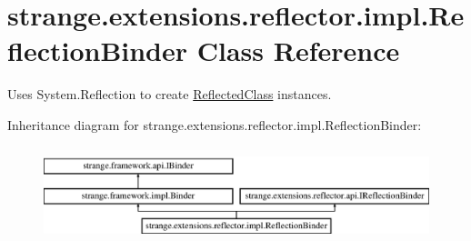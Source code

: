 \hypertarget{classstrange_1_1extensions_1_1reflector_1_1impl_1_1_reflection_binder}{\section{strange.\-extensions.\-reflector.\-impl.\-Reflection\-Binder Class Reference}
\label{classstrange_1_1extensions_1_1reflector_1_1impl_1_1_reflection_binder}
}


Uses System.\-Reflection to create {\ttfamily \hyperlink{classstrange_1_1extensions_1_1reflector_1_1impl_1_1_reflected_class}{Reflected\-Class}} instances.  


Inheritance diagram for strange.\-extensions.\-reflector.\-impl.\-Reflection\-Binder\-:\begin{figure}[H]
\begin{center}
\leavevmode
\includegraphics[height=2.800000cm]{classstrange_1_1extensions_1_1reflector_1_1impl_1_1_reflection_binder}
\end{center}
\end{figure}
